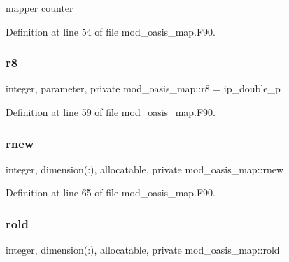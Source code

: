 mapper counter 



Definition at line 54 of file mod\+\_\+oasis\+\_\+map.\+F90.

\mbox{\label{namespacemod__oasis__map_a30ebe320b9e4c06a1ee1f2a0bbacf2c4}} 
\subsubsection{\texorpdfstring{r8}{r8}}
{\footnotesize\ttfamily integer, parameter, private mod\+\_\+oasis\+\_\+map\+::r8 = ip\+\_\+double\+\_\+p\hspace{0.3cm}{\ttfamily [private]}}



Definition at line 59 of file mod\+\_\+oasis\+\_\+map.\+F90.

\mbox{\label{namespacemod__oasis__map_a2575785d3ea5e1a37c7f6303f00eb727}} 
\subsubsection{\texorpdfstring{rnew}{rnew}}
{\footnotesize\ttfamily integer, dimension(\+:), allocatable, private mod\+\_\+oasis\+\_\+map\+::rnew\hspace{0.3cm}{\ttfamily [private]}}



Definition at line 65 of file mod\+\_\+oasis\+\_\+map.\+F90.

\mbox{\label{namespacemod__oasis__map_a2931a6f582d0173cc0e6b155b8cb55b7}} 
\subsubsection{\texorpdfstring{rold}{rold}}
{\footnotesize\ttfamily integer, dimension(\+:), allocatable, private mod\+\_\+oasis\+\_\+map\+::rold\hspace{0.3cm}{\ttfamily [private]}}



